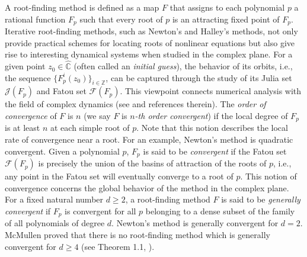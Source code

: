 \documentclass[12pt]{article}
\begin{document}
A root-finding method is defined as a map $ F $ that assigns to each polynomial $ p $ a rational function $ F_p $ such that every root of $ p $ is an attracting fixed point of $ F_p $.
 Iterative root-finding methods, such as Newton's and Halley's methods, not only provide practical schemes for locating roots of nonlinear equations but also give rise to interesting dynamical systems when studied in the complex plane. For a given point $z_0\in \widehat{\mathbb{C}}$ (often called an \textit{initial guess}), the behavior of its orbits, i.e., the sequence $\{F_p^i(z_0)\}_{i\in \mathbb{Z}}$, can be captured through the study of its Julia set $ \mathcal{J}(F_p)$ and Fatou set $ \mathcal{F}(F_p) $. This viewpoint connects numerical analysis with the field of complex dynamics (see \cite{ABP2004,BH2003,McMullen1987} and references therein). The \textit{order of convergence} of $F$ is $n$ (we say $F$ is \textit{$n$-th order convergent}) if the local degree of $F_p$ is at least $n$ at each simple root of $p$. Note that this notion describes the local rate of convergence near a root. For an example, Newton's method is quadratic convergent. Given a polynomial $p$, $F_p$ is said to be \textit{convergent} if the Fatou set $\mathcal{F}(F_p)$ is precisely the union of the basins of attraction of the roots of $p$, i.e., any point in the Fatou set will eventually converge to a root of $p$. This notion of convergence concerns the global behavior of the method in the complex plane. For a fixed natural number $d\geq 2$, a root-finding method $F$ is said to be \textit{generally convergent} if $F_p$ is convergent for all $p$ belonging to a dense subset of the family of all polynomials of degree $d$. Newton's method is generally convergent for $d=2$. McMullen proved that there is no root-finding method which is generally convergent for $d\geq 4$ (see Theorem 1.1, \cite{McMullen1987}).
\end{document}
